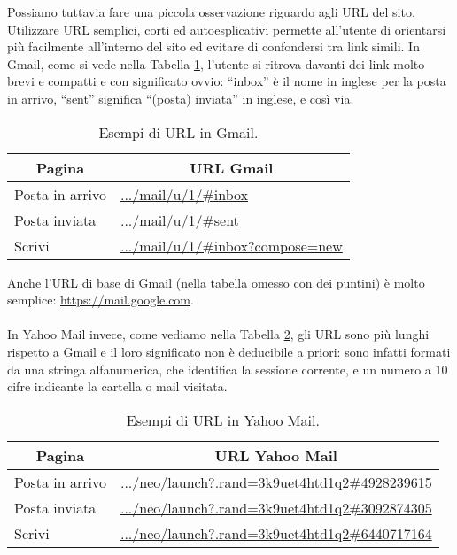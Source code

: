 		Possiamo tuttavia fare una piccola osservazione riguardo agli URL del sito. Utilizzare URL semplici, corti ed autoesplicativi permette all'utente di orientarsi più facilmente all'interno del sito ed evitare di confondersi tra link simili. In Gmail, come si vede nella Tabella \ref{tab:url_gmail}, l'utente si ritrova davanti dei link molto brevi e compatti e con significato ovvio: ``inbox'' è il nome in inglese per la posta in arrivo, ``sent'' significa ``(posta) inviata'' in inglese, e così via.
		\begin{table}[h!]
			\centering
			\begin{tabular}{|l|l|}
				\hline
				\multicolumn{1}{|c|}{\textbf{Pagina}}& \multicolumn{1}{c|}{\textbf{URL Gmail}}\\ \hline\hline
				Posta in arrivo & \url{.../mail/u/1/#inbox}\\ \hline
				Posta inviata & \url{.../mail/u/1/#sent}\\ \hline
				Scrivi & \url{.../mail/u/1/#inbox?compose=new}\\ \hline
			\end{tabular}
			\caption[URL in Gmail]{Esempi di URL in Gmail.}
			\label{tab:url_gmail}
		\end{table}
		
		Anche l'URL di base di Gmail (nella tabella omesso con dei puntini) è molto semplice: \url{https://mail.google.com}.\\
		\\
		In Yahoo Mail invece, come vediamo nella Tabella \ref{tab:url_yahoo}, gli URL sono più lunghi rispetto a Gmail e il loro significato non è deducibile a priori: sono infatti formati da una stringa alfanumerica, che identifica la sessione corrente, e un numero a 10 cifre indicante la cartella o mail visitata.
		\begin{table}[h!]
			\centering
			\begin{tabular}{|l|l|}
				\hline
				\multicolumn{1}{|c|}{\textbf{Pagina}}& \multicolumn{1}{c|}{\textbf{URL Yahoo Mail}}\\ \hline\hline
				Posta in arrivo & \url{.../neo/launch?.rand=3k9uet4htd1q2#4928239615}\\ \hline
				Posta inviata & \url{.../neo/launch?.rand=3k9uet4htd1q2#3092874305}\\ \hline
				Scrivi & \url{.../neo/launch?.rand=3k9uet4htd1q2#6440717164}\\ \hline
			\end{tabular}
			\caption[URL in Yahoo Mail]{Esempi di URL in Yahoo Mail.}
			\label{tab:url_yahoo}
		\end{table}
		
